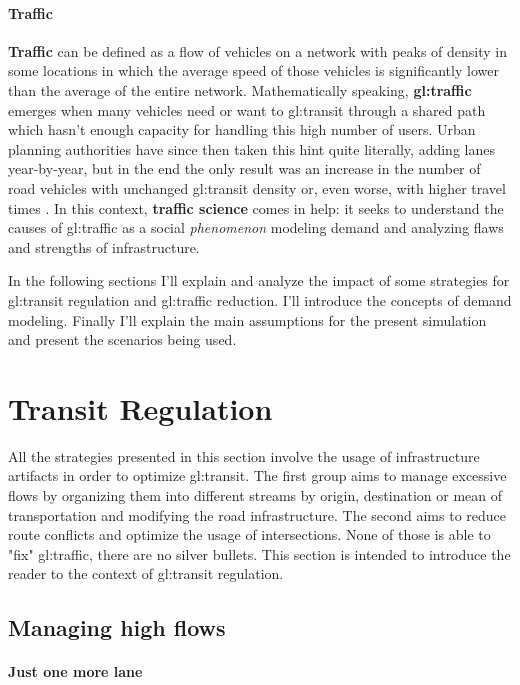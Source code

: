 \paragraph{Traffic}

\textbf{Traffic} can be defined as a flow of vehicles on a network with peaks of density in some locations in which the average speed of those vehicles is significantly lower than the average of the entire network.
Mathematically speaking, \textbf{\gls{gl:traffic}} emerges when many vehicles need or want to \gls{gl:transit} through a shared path which hasn't enough capacity for handling this high number of users.
Urban planning authorities have since then taken this hint quite literally, adding lanes year-by-year, but in the end the only result was an increase in the number of road vehicles with unchanged \gls{gl:transit} density or, even worse, with higher travel times \cite{Speck2018}.
In this context, \textbf{traffic science} comes in help: it seeks to understand the causes of \gls{gl:traffic} as a social \textit{phenomenon} modeling demand and analyzing flaws and strengths of infrastructure.

In the following sections I'll explain and analyze the impact of some strategies for \gls{gl:transit} regulation and \gls{gl:traffic} reduction. I'll introduce the concepts of demand modeling. Finally I'll explain the main assumptions for the present simulation and present the scenarios being used.

\section{Transit Regulation}

All the strategies presented in this section involve the usage of infrastructure artifacts in order to optimize \gls{gl:transit}. The first group aims to manage excessive flows by organizing them into different streams by origin, destination or mean of transportation and modifying the road infrastructure. The second aims to reduce route conflicts and optimize the usage of intersections. None of those is able to "fix" \gls{gl:traffic}, there are no silver bullets. This section is intended to introduce the reader to the context of \gls{gl:transit} regulation.

\subsection{Managing high flows}

\paragraph{Just one more lane}

